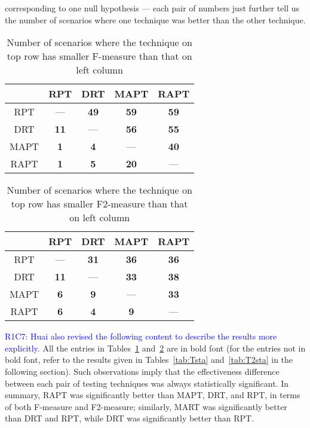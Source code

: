 \documentclass[10pt,journal,compsoc]{IEEEtran}
\begin{document}
corresponding to one null hypothesis --- each pair of numbers just further tell us the number of scenarios where one technique was better than the other technique.

\begin{table}
\caption{Number of scenarios where the technique on top row has smaller F-measure than that on left column}
\label{tab:Fsta}
\centering
\begin{tabular}{|c|c|c|c|c|} \hline
			& RPT					& DRT					& MAPT				& RAPT				\\ \hline
RPT		& ---					& \textbf{49}	& \textbf{59}	& \textbf{59}	\\ \hline
DRT		& \textbf{11}	& ---					& \textbf{56}	& \textbf{55}	\\ \hline
MAPT	& \textbf{1}	& \textbf{4}	& ---					& \textbf{40}	\\ \hline
RAPT	& \textbf{1}	& \textbf{5}	& \textbf{20}	& ---					\\ \hline
\end{tabular}
\end{table}

\begin{table}
\caption{Number of scenarios where the technique on top row has smaller F2-measure than that on left column}
\label{tab:F2sta}
\centering
\begin{tabular}{|c|c|c|c|c|} \hline
			& RPT					& DRT					& MAPT				& RAPT				\\ \hline
RPT		& ---					& \textbf{31}	& \textbf{36}	& \textbf{36}	\\ \hline
DRT		& \textbf{11}	& ---					& \textbf{33}	& \textbf{38}	\\ \hline
MAPT	& \textbf{6}	& \textbf{9}	& ---					& \textbf{33}	\\ \hline
RAPT	& \textbf{6}	& \textbf{4}	& \textbf{9}	& ---					\\ \hline
\end{tabular}
\end{table}

\textcolor{blue}{R1C7: Huai also revised the following content to describe the results more explicitly.} All the entries in Tables~\ref{tab:Fsta} and~\ref{tab:F2sta} are in bold font (for the entries not in bold font, refer to the results given in Tables~\ref{tab:Tsta} and~\ref{tab:T2sta} in the following section). Such observations imply that the effectiveness difference between each pair of testing techniques was always statistically significant. In summary, RAPT was significantly better than MAPT, DRT, and RPT, in terms of both F-measure and F2-measure; similarly, MART was significantly better than DRT and RPT, while DRT was significantly better than RPT.
\end{document}
